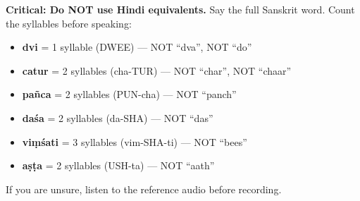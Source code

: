 \documentclass[11pt,a4paper]{article}
\begin{document}
\vspace{0.3cm}
\begin{warnbox}
\textbf{Critical: Do NOT use Hindi equivalents.}
Say the full Sanskrit word. Count the syllables before speaking:
\begin{itemize}[leftmargin=1.2em, itemsep=2pt]
  \item \textbf{dvi} = 1 syllable (DWEE) --- NOT ``dva'', NOT ``do''
  \item \textbf{catur} = 2 syllables (cha-TUR) --- NOT ``char'', NOT ``chaar''
  \item \textbf{pa\~{n}ca} = 2 syllables (PUN-cha) --- NOT ``panch''
  \item \textbf{da\'{s}a} = 2 syllables (da-SHA) --- NOT ``das''
  \item \textbf{vi\d{m}\'{s}ati} = 3 syllables (vim-SHA-ti) --- NOT ``bees''
  \item \textbf{a\d{s}\d{t}a} = 2 syllables (USH-ta) --- NOT ``aath''
\end{itemize}
If you are unsure, listen to the reference audio before recording.
\end{warnbox}
\end{document}
